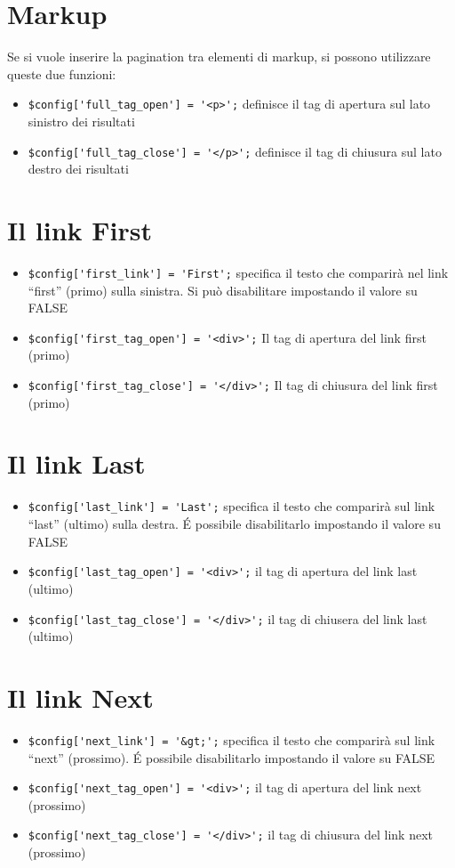 \section*{Markup}
Se si vuole inserire la pagination tra elementi di markup, si possono utilizzare queste due funzioni:

\begin{itemize}
\item \verb|$config['full_tag_open'] = '<p>';| definisce il tag di apertura sul lato sinistro dei risultati
\item \verb|$config['full_tag_close'] = '</p>';| definisce il tag di chiusura sul lato destro dei risultati
\end{itemize}

\section*{Il link First}
\begin{itemize}
\item \verb|$config['first_link'] = 'First';| specifica il testo che comparirà nel link ``first'' (primo) sulla sinistra. Si può disabilitare impostando il valore su FALSE
\item \verb|$config['first_tag_open'] = '<div>';| Il tag di apertura del link first (primo)
\item \verb|$config['first_tag_close'] = '</div>';| Il tag di chiusura del link first (primo)
\end{itemize}

\section*{Il link Last}
\begin{itemize}
\item \verb|$config['last_link'] = 'Last';| specifica il testo che comparirà  sul link ``last'' (ultimo) sulla destra. \'E possibile disabilitarlo impostando il valore su FALSE
\item \verb|$config['last_tag_open'] = '<div>';| il tag di apertura del link last (ultimo)
\item \verb|$config['last_tag_close'] = '</div>';| il tag di chiusera del link last (ultimo)
\end{itemize}

\section*{Il link Next}
\begin{itemize}
\item \verb|$config['next_link'] = '&gt;';| specifica il testo che comparirà  sul link ``next'' (prossimo). \'E possibile disabilitarlo impostando il valore su FALSE
\item \verb|$config['next_tag_open'] = '<div>';| il tag di apertura del link next (prossimo)
\item \verb|$config['next_tag_close'] = '</div>';| il tag di chiusura del link next (prossimo)
\end{itemize}

